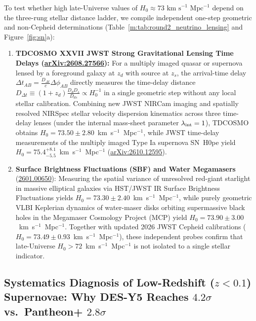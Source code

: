 \documentclass[aps,prd,preprint,superscriptaddress,nofootinbib]{revtex4-2}
\begin{document}
To test whether high late-Universe values of $H_0 \approx 73\text{ km s}^{-1}\text{ Mpc}^{-1}$ depend on the three-rung stellar distance ladder, we compile independent one-step geometric and non-Cepheid determinations (Table~\ref{m:tab:round2_neutrino_lensing} and Figure~\ref{fig:sn}a):
\begin{enumerate}
    \setlength{\itemsep}{3pt}
    \item \textbf{TDCOSMO XXVII JWST Strong Gravitational Lensing Time Delays (\href{https://arxiv.org/abs/2608.27566}{arXiv:2608.27566}):} For a multiply imaged quasar or supernova lensed by a foreground galaxy at $z_d$ with source at $z_s$, the arrival-time delay $\Delta t_{AB} = \frac{D_{\Delta t}}{c} \Delta\phi_{AB}$ directly measures the time-delay distance $D_{\Delta t} \equiv (1+z_d)\frac{D_d D_s}{D_{ds}} \propto H_0^{-1}$ in a single geometric step without any local stellar calibration. Combining new JWST NIRCam imaging and spatially resolved NIRSpec stellar velocity dispersion kinematics across three time-delay lenses (under the internal mass-sheet parameter $\lambda_{\rm int} = 1$), TDCOSMO obtains $H_0 = 73.50 \pm 2.80$~km~s$^{-1}$~Mpc$^{-1}$, while JWST time-delay measurements of the multiply imaged Type Ia supernova SN~H0pe yield $H_0 = 75.4^{+8.1}_{-5.5}$~km~s$^{-1}$~Mpc$^{-1}$ (\href{https://arxiv.org/html/2610.12595v1}{arXiv:2610.12595}).
    \item \textbf{Surface Brightness Fluctuations (SBF) and Water Megamasers} (\href{https://arxiv.org/pdf/2601.00650}{2601.00650}): Measuring the spatial variance of unresolved red-giant starlight in massive elliptical galaxies via HST/JWST IR Surface Brightness Fluctuations yields $H_0 = 73.30 \pm 2.40$~km~s$^{-1}$~Mpc$^{-1}$, while purely geometric VLBI Keplerian dynamics of water-maser disks orbiting supermassive black holes in the Megamaser Cosmology Project (MCP) yield $H_0 = 73.90 \pm 3.00$~km~s$^{-1}$~Mpc$^{-1}$. Together with updated 2026 JWST Cepheid calibrations ($H_0 = 73.49 \pm 0.93$~km~s$^{-1}$~Mpc$^{-1}$), these independent probes confirm that late-Universe $H_0 > 72$~km~s$^{-1}$~Mpc$^{-1}$ is not isolated to a single stellar indicator.
\end{enumerate}

\subsection{Systematics Diagnosis of Low-Redshift ($z < 0.1$) Supernovae: Why DES-Y5 Reaches $4.2\sigma$ vs.\ Pantheon+ $2.8\sigma$}
\end{document}
